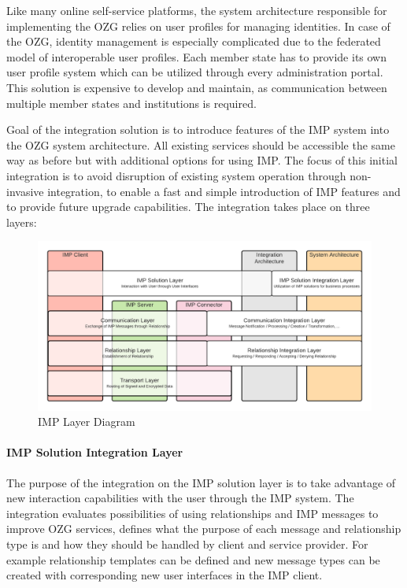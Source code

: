 Like many online self-service platforms, the system architecture responsible for implementing the OZG relies on user profiles for managing identities. In case of the OZG, identity management is especially complicated due to the federated model of interoperable user profiles. Each member state has to provide its own user profile system which can be utilized through every administration portal. This solution is expensive to develop and maintain, as communication between multiple member states and institutions is required.







Goal of the integration solution is to introduce features of the IMP system into the OZG system architecture. All existing services should be accessible the same way as before but with additional options for using IMP. The focus of this initial integration is to avoid disruption of existing system operation through non-invasive integration, to enable a fast and simple introduction of IMP features and to provide future upgrade capabilities. The integration takes place on three layers:

\begin{figure}[h]
\caption{IMP Layer Diagram}
    \centering
    \includegraphics[scale=0.3]{Diagrams/Integration Architecture 1/IMP Layer Diagram Integration.png}
\end{figure}

\paragraph{IMP Solution Integration Layer} 
The purpose of the integration on the IMP solution layer is to take advantage of new interaction capabilities with the user through the IMP system. The integration evaluates possibilities of using relationships and IMP messages to improve OZG services, defines what the purpose of each message and relationship type is and how they should be handled by client and service provider. For example relationship templates can be defined and new message types can be created with corresponding new user interfaces in the IMP client.

